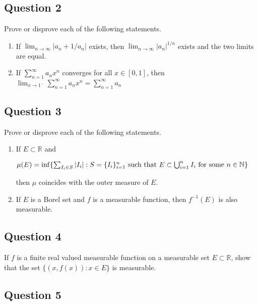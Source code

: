 \documentclass[12pt]{article}
\begin{document}
\hypertarget{question-2-1}{%
\subsection{Question 2}\label{question-2-1}}

Prove or disprove each of the following statements.

\begin{enumerate}
\def\labelenumi{(\alph{enumi})}
\setcounter{enumi}{3}
\item
  If \(\lim_{n\to\infty} |a_n+1/a_n|\) exists, then
  \(\lim_{n\to \infty} |a_n|^{1/n}\) exists and the two limits are
  equal.
\item
  If \(\sum_{n=1}^\infty a_n x^n\) converges for all \(x \in [0, 1]\),
  then
  \(\lim_{x\to 1^-} \sum_{n=1}^\infty a_n x^n=\sum_{n=1}^\infty a_n\)
\end{enumerate}

\hypertarget{question-3-1}{%
\subsection{Question 3}\label{question-3-1}}

Prove or disprove each of the following statements.

\begin{enumerate}
\def\labelenumi{(\alph{enumi})}
\setcounter{enumi}{5}
\item
  If \(E \subset \mathbb{R}\) and

  \(\mu(E) = \inf\{\sum_{I_i \in S} |I_i| : S = \{I_i\}_{i=1}^n \text{ such that } E \subset \bigcup_{i=1}^n I_i \text{ for some } n \in \mathbb{N}\}\)

  then \(\mu\) coincides with the outer measure of \(E\).
\item
  If \(E\) is a Borel set and \(f\) is a measurable function, then
  \(f^{-1}(E)\) is also measurable.
\end{enumerate}

\hypertarget{question-4-1}{%
\subsection{Question 4}\label{question-4-1}}

If \(f\) is a finite real valued measurable function on a measurable set
\(E \subset \mathbb{R}\), show that the set \(\{(x, f(x)) : x \in E\}\)
is measurable.

\hypertarget{question-5-1}{%
\subsection{Question 5}\label{question-5-1}}
\end{document}
